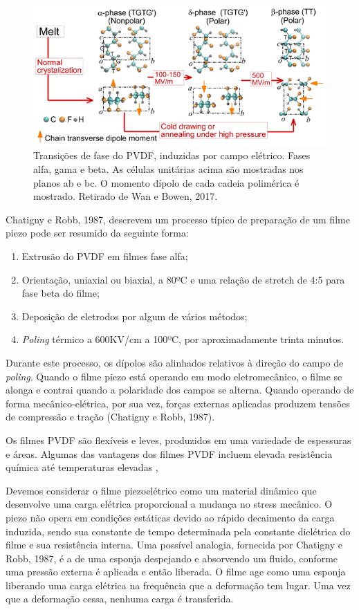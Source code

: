 \documentclass[
	12pt,				
	oneside,			
	a4paper,			
	english,			
	brazil				
	]{abntex2ppgsi}
\begin{document}
\begin{figure}[!htb]
\centering
\includegraphics{Figura20}
\caption {Transições de fase do PVDF, induzidas por campo elétrico. Fases alfa, gama e beta. As células unitárias acima são mostradas nos planos ab e bc. O momento dípolo de cada cadeia polimérica é mostrado. Retirado de Wan e Bowen, 2017.}
\label{Figura20}
\end{figure}

Chatigny e Robb, 1987, descrevem um processo típico de preparação de um filme piezo pode ser resumido da seguinte forma:

\begin{enumerate}
	\item Extrusão do PVDF em filmes fase alfa; 
	\item Orientação, uniaxial ou biaxial, a 80ºC e uma relação de stretch de 4:5 para fase beta do filme;
	\item Deposição de eletrodos por algum de vários métodos;
	\item \textit{Poling} térmico a 600KV/cm a 100ºC, por aproximadamente trinta minutos.
\end{enumerate}

Durante este processo, os dípolos são alinhados relativos à direção do campo de \textit{poling}. Quando o filme piezo está operando em modo eletromecânico, o filme se alonga e contrai quando a polaridade dos campos se alterna. Quando operando de forma mecânico-elétrica, por sua vez, forças externas aplicadas produzem tensões de compressão e tração (Chatigny e Robb, 1987). 

Os filmes PVDF são flexíveis e leves, produzidos em uma variedade de espessuras e áreas. Algumas das vantagens dos filmes PVDF incluem elevada resistência química até temperaturas elevadas , 

Devemos considerar o filme piezoelétrico como um material dinâmico que desenvolve uma carga elétrica proporcional a mudança no stress mecânico. O piezo não opera em condições estáticas devido ao rápido decaimento da carga induzida, sendo sua constante de tempo determinada pela constante dielétrica do filme e sua resistência interna. 	Uma possível analogia, fornecida por Chatigny e Robb, 1987, é a de uma esponja despejando e absorvendo um fluido, conforme uma pressão externa é aplicada e então liberada. O filme age como uma esponja liberando uma carga elétrica na frequência que a deformação tem lugar. Uma vez que a deformação cessa, nenhuma carga é transferida. 
\end{document}
